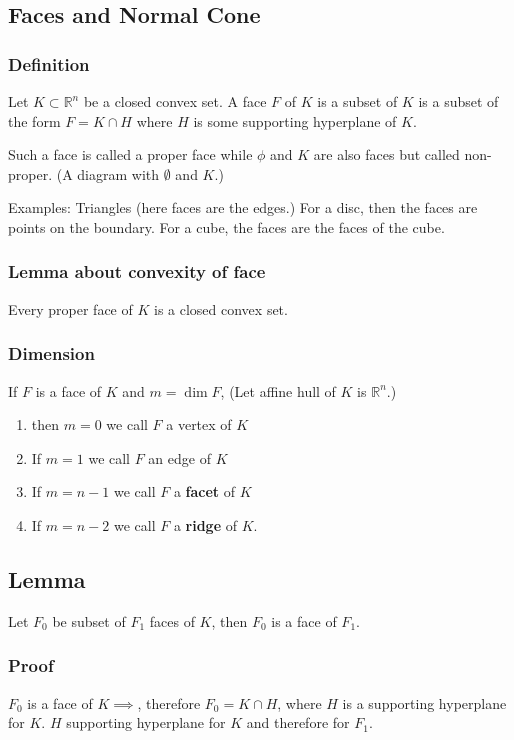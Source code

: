 \documentclass[11pt]{article}
\def\R{\mathbb{R}}
\begin{document}
\subsection{Faces and Normal Cone}
\label{sec:orge92b846}

\subsubsection{Definition}
\label{sec:org6429c11}
Let \(K\subset \R^n\) be a closed convex set. A face \(F\) of \(K\) is a subset of
\(K\) is a subset of the form \(F = K \cap H\) where \(H\) is some supporting
hyperplane of \(K\). 

Such a face is called a proper face while \(\phi\) and \(K\) are also faces but
called non-proper. (A diagram with \(\emptyset\) and \(K\).)

Examples: Triangles (here faces are the edges.) For a disc, then the faces
are points on the boundary. For a cube, the faces are the faces of the cube.
\subsubsection{Lemma about convexity of face}
\label{sec:org1913474}
Every proper face of \(K\) is a closed convex set.
\subsubsection{Dimension}
\label{sec:orgf983001}
If \(F\) is a face of \(K\) and \(m=\dim F\), (Let affine hull of \(K\) is \(\R^n\).)
\begin{enumerate}
\item then \(m=0\) we call \(F\) a vertex of \(K\)
\item If \(m=1\) we call \(F\) an edge of \(K\)
\item If \(m=n-1\) we call \(F\) a \textbf{facet} of \(K\)
\item If \(m=n-2\) we call \(F\) a \textbf{ridge} of \(K\).
\end{enumerate}
\subsection{Lemma}
\label{sec:org4a7dc75}
Let \(F_0\) be subset of \(F_1\) faces of \(K\), then \(F_0\) is a face of \(F_1\).
\subsubsection{Proof}
\label{sec:org8e18d22}
\(F_0\) is a face of \(K \implies\), therefore \(F_0 = K \cap H\), where \(H\) is a
supporting hyperplane for \(K\). \(H\) supporting hyperplane for \(K\) and
therefore for \(F_1\).
\end{document}
